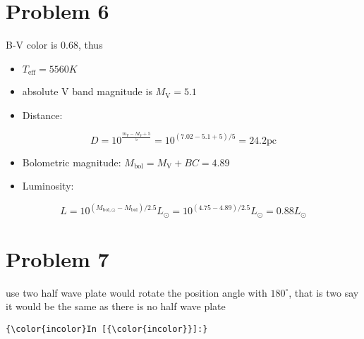 \documentclass{article}
\begin{document}
    \section{Problem 6}\label{problem-6}

B-V color is 0.68, thus

\begin{itemize}
\itemsep1pt\parskip0pt
\item
  $T_\mathrm{eff} = 5560K$
\item
  absolute V band magnitude is $M_\mathrm{V} = 5.1$
\item
  Distance:
\end{itemize}

\begin{equation}
D = 10^{\frac{m_V - M_V + 5}{5}} = 10^{(7.02 - 5.1 +5)/5} = 24.2 \mathrm{pc}
\end{equation}

\begin{itemize}
\itemsep1pt\parskip0pt
\item
  Bolometric magnitude: $M_\mathrm{bol} = M_\mathrm{V} + BC = 4.89$
\item
  Luminosity:
\end{itemize}

\begin{equation}
L = 10^{(M_{\mathrm{bol},\odot} - M_\mathrm{bol})/2.5} L_\odot= 10^{(4.75 - 4.89)/2.5}L_\odot = 0.88L_\odot
\end{equation}

    \section{Problem 7}\label{problem-7}

use two half wave plate would rotate the position angle with
$180^\circ$, that is two say it would be the same as there is no half
wave plate

    \begin{Verbatim}[commandchars=\\\{\}]
{\color{incolor}In [{\color{incolor}}]:} 
\end{Verbatim}


    
    
    
    
\end{document}
